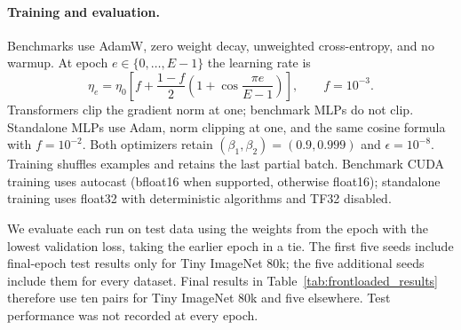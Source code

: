 \paragraph{Training and evaluation.}
Benchmarks use AdamW, zero weight decay, unweighted cross-entropy, and no warmup. At epoch $e\in\{0,\ldots,E-1\}$ the learning rate is
\[
\eta_e=\eta_0\left[f+\frac{1-f}{2}\left(1+\cos\frac{\pi e}{E-1}\right)\right],
\qquad f=10^{-3}.
\]
Transformers clip the gradient norm at one; benchmark MLPs do not clip. Standalone MLPs use Adam, norm clipping at one, and the same cosine formula with $f=10^{-2}$. Both optimizers retain $(\beta_1,\beta_2)=(0.9,0.999)$ and $\epsilon=10^{-8}$. Training shuffles examples and retains the last partial batch. Benchmark CUDA training uses autocast (bfloat16 when supported, otherwise float16); standalone training uses float32 with deterministic algorithms and TF32 disabled.

We evaluate each run on test data using the weights from the epoch with the lowest validation loss, taking the earlier epoch in a tie. The first five seeds include final-epoch test results only for Tiny ImageNet 80k; the five additional seeds include them for every dataset. Final results in Table~\ref{tab:frontloaded_results} therefore use ten pairs for Tiny ImageNet 80k and five elsewhere. Test performance was not recorded at every epoch.

